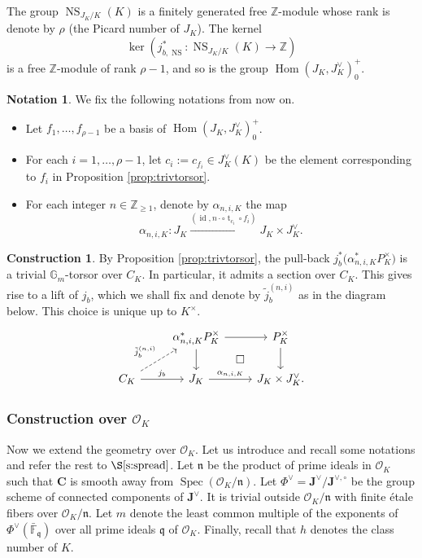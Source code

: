 \documentclass[11pt,oneside]{amsart}
\theoremstyle{plain}
\theoremstyle{definition}
\newtheorem{construction}[theorem]{Construction}
\newtheorem{notation}[theorem]{Notation}
\def\G{{\bf G}}
\DeclareMathOperator{\NS}{NS}
\DeclareMathOperator{\id}{id} \DeclareMathOperator{\Sel}{Sel}
\DeclareMathOperator{\Hom}{Hom}
\DeclareMathOperator{\spec}{Spec} \DeclareMathOperator{\sgn}{sign}
\DeclareMathOperator{\tr}{t}
\def\Z{\mathbb{Z}}
\def\F{\mathbb{F}}
\def\J{\mathbf{J}}
\def\Jo{\mathbf{J}^{\vee,\circ}}
\def\G{\mathbb{G}}
\def\CC{\mathbf{C}}
\def\ra{\rightarrow}
\def\oh{\mathcal{O}}
\begin{document}
The group $\NS_{J_K/K}(K)$ is a finitely generated free $\Z$-module whose rank is denote by $\rho$ (the Picard number of $J_K$). The kernel 
$$\ker (j_{b, \NS}^*: \NS_{J_K/K} (K) \ra \Z)$$ is a free $\Z$-module of rank $\rho-1$, and so is the group $\Hom(J_K, J_K^\vee)_0^+$.

\begin{notation} \label{notation:f_i} 
We fix the following notations from now on.
\begin{itemize} 
\item Let $f_1, \ldots, f_{\rho-1}$ be a basis of $\Hom(J_K, J_K^\vee)_0^+$. 
\item For each $i=1, \ldots, \rho-1$, let $c_i:=c_{f_i}\in J_K^\vee(K)$ be the element corresponding to $f_i$ in Proposition \ref{prop:trivtorsor}.
\item For each integer $n\in \mathbb{Z}_{\ge 1}$, denote by $\alpha_{n, i, K}$ the map 
$$
\alpha_{n, i, K}: J_K \xrightarrow{(\id, n\cdot \circ \tr_{c_i} \circ f_i)} J_K\times J_K^\vee.
$$
\end{itemize}
\end{notation}

\begin{construction}\label{cons:lifting_over_K} By Proposition \ref{prop:trivtorsor}, the pull-back $j_b^* \big( \alpha_{n, i, K}^* P_K^\times \big)$ is a trivial $\G_m$-torsor over $C_K$. 
In particular, it admits a section over $C_K$. This gives rise to a lift of $j_b$, which we shall fix and denote by $\tilde{j}_{b}^{(n, i)}$ as in the diagram below.  This choice is unique up to $K^\times$.
\begin{equation}\label{diag:AJliftK}
\begin{tikzcd}[bend angle = 20]
  & \alpha_{n, i, K}^* P_K^\times  \arrow{r} \arrow{d} \arrow[phantom]{dr}{\square}
  & P_K^\times \arrow{d} \\
  C_K \arrow{r}{j_b} \arrow[dashrightarrow]{ru}{\tilde{j}_{b}^{(n, i)}}
  & J_K \arrow{r}{\alpha_{n, i, K}}
  & J_K\times J_K^\vee.
\end{tikzcd}
\end{equation}
\end{construction}

 

\subsubsection{Construction over $\oh_K$}

Now we extend the geometry over $\oh_K$. Let us introduce and recall some notations and refer the rest to $\S \ref{s:spread}$. Let $\mathfrak{n}$ be the product of prime ideals in $\oh_K$ such that $\CC$ is smooth away from $\spec(\oh_K/\mathfrak{n})$. Let $\Phi^\vee = \J^\vee / \Jo$ be the group scheme of connected components of $\J^\vee$. It is trivial outside $\oh_K/\mathfrak{n}$ with finite \'etale fibers over $\oh_K/\mathfrak{n}$. Let $m$ denote the least common multiple of the exponents of $\Phi^\vee(\bar{\F}_\mathfrak{q})$ over all prime ideals $\mathfrak{q}$ of $\oh_K$. Finally, recall that $h$ denotes the class number of $K$. 
\end{document}
